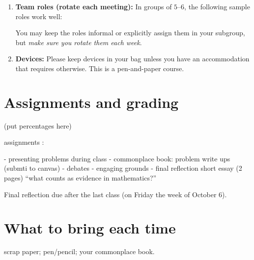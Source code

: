 \documentclass[oneside,11pt]{amsart}
\begin{document}
\begin{enumerate}[$\bullet$]
  \item \textbf{Team roles (rotate each meeting):} In groups of $5$--$6$, 
		the following sample roles work well:
		You may keep the roles informal or explicitly assign them in your
		subgroup, but \emph{make sure you rotate them each week}.

  \item \textbf{Devices:} Please keep devices in your bag 
		unless you have an accommodation that requires otherwise.
		This is a pen-and-paper course.
\end{enumerate}





\section{Assignments and grading}

(put percentages here)

assignments :

- presenting problems during class
- commonplace book: problem write ups (submti to canvas)
- debates
- engaging grounds
- final reflection short essay (2 pages) ``what counts as evidence in mathematics?''

Final reflection due after the last class (on Friday the week of October 6).

\section{What to bring each time}
scrap paper; pen/pencil; your commonplace book.
\end{document}
